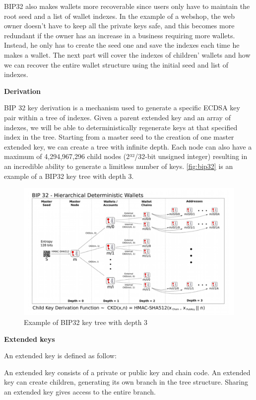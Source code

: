 BIP32 also makes wallets more recoverable since users only have to maintain the root seed and a list of wallet indexes. In the example of a webshop, the web owner doesn’t have to keep all the private keys safe, and this becomes more redundant if the owner has an increase in a business requiring more wallets. Instead, he only has to create the seed one and save the indexes each time he makes a wallet. The next part will cover the indexes of children’ wallets and how we can recover the entire wallet structure using the initial seed and list of indexes. 

\bigskip
{\textbf{Derivation}}

BIP 32 key derivation is a mechanism used to generate a specific ECDSA key pair within a tree of indexes. Given a parent extended key and an array of indexes, we will be able to deterministically regenerate keys at that specified index in the tree. Starting from a master seed to the creation of one master extended key, we can create a tree with infinite depth. Each node can also have a maximum of 4,294,967,296 child nodes (2³²/32-bit unsigned integer) resulting in an incredible ability to generate a limitless number of keys. \autoref{fig:bip32} is an example of a BIP32 key tree with depth 3.

\begin{figure}[ht!]
  \centering
  \includegraphics[width=1\textwidth]{images/bip32.png}
  \caption[Example of BIP32 key tree with depth 3]{Example of BIP32 key tree with depth 3}
  \label{fig:bip32}
\end{figure}


\bigskip
{\textbf{Extended keys}}

An extended key is defined as follow: 

\begin{adjustwidth}{2cm}{}
    An extended key consists of a private or public key and chain code. An extended key can create children, generating its own branch in the tree structure. Sharing an extended key gives access to the entire branch.
\end{adjustwidth}

